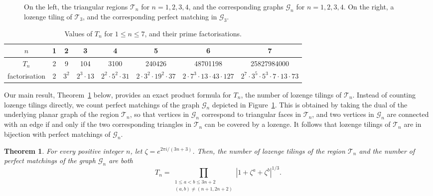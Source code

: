 \documentclass{article}
\newtheorem{theorem}{Theorem}[section]
\begin{document}
\begin{figure}[h]
\begin{minipage}{0.18\textwidth}
\begin{center}
\end{center}
\end{minipage}
    \caption{On the left, the triangular regions $\mathcal{T}_n$ for $n=1,2,3,4$, and the corresponding graphs $\mathcal{G}_n$ for $n=1,2,3,4$. On the right, a lozenge tiling of $\mathcal{T}_3$, and the corresponding perfect matching in $\mathcal{G}_3$.}\label{fig:intro}
\end{figure}

\begin{table}[h]
\renewcommand{\arraystretch}{1.25}
\begin{center}
\begin{tabular}{c||c|c|c|c|c|c|c}
 $n$ & 1 & 2 & 3 & 4 & 5 & 6 & 7 \\\hline
 $T_n$ & 2 & 9 & 104 & 3100 & 240426 & 48701198 & 25827984000 \\\hline
 factorisation & 2 & $3^2$ & $2^3\cdot13$ & $2^2\cdot 5^2\cdot 31$ & $2\cdot3^2\cdot19^2\cdot37$ & $2\cdot 7^3\cdot13\cdot43\cdot127$ & $2^7\cdot3^5\cdot5^3\cdot7\cdot13\cdot73$ \\   
\end{tabular}
\end{center}
\caption{Values of $T_n$ for $1\leq n\leq 7$, and their prime factorisations.}\label{table:1}
\end{table}

Our main result, Theorem~\ref{thm:main} below, provides an exact product formula for $T_n$, the number of lozenge tilings of $\mathcal{T}_n$. Instead of counting lozenge tilings directly, we count perfect matchings of the graph $\mathcal{G}_n$ depicted in Figure~\ref{fig:intro}. This is obtained by taking the dual of the underlying planar graph of the region $\mathcal{T}_n$, so that vertices in $\mathcal{G}_n$ correspond to triangular faces in $\mathcal{T}_n$, and two vertices in $\mathcal{G}_n$ are connected with an edge if and only if the two corresponding triangles in $\mathcal{T}_n$ can be covered by a lozenge. It follows that lozenge tilings of $\mathcal{T}_n$ are in bijection with perfect matchings of $\mathcal{G}_n$.  
\begin{theorem}\label{thm:main}
For every positive integer $n$, let $\zeta=e^{2\pi i/(3n+3)}$. Then, the number of lozenge tilings of the region $\mathcal{T}_n$ and the number of perfect matchings of the graph $\mathcal{G}_n$ are both
\[T_n=\prod_{\substack{1\leq a<b\leq 3n+2\\(a,b)\not=(n+1,2n+2)}}\left|1+\zeta^a+\zeta^b\right|^{1/3}.\]
\end{theorem}
\end{document}
